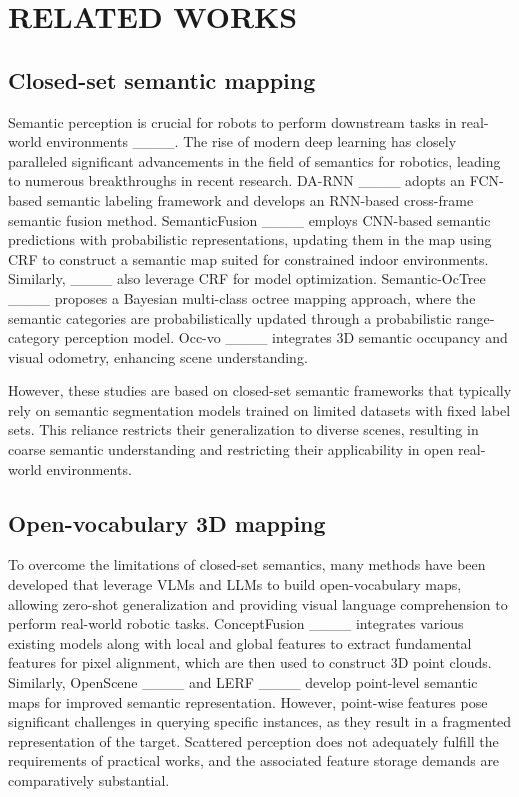 \section{RELATED WORKS}
\label{RW}

\subsection{Closed-set semantic mapping}
Semantic perception is crucial for robots to perform downstream tasks in real-world environments ____. The rise of modern deep learning has closely paralleled significant advancements in the field of semantics for robotics, leading to numerous breakthroughs in recent research. 
DA-RNN ____ adopts an FCN-based semantic labeling framework and develops an RNN-based cross-frame semantic fusion method. 
SemanticFusion ____ employs CNN-based semantic predictions with probabilistic representations, updating them in the map using CRF to construct a semantic map suited for constrained indoor environments. Similarly, ____ also leverage CRF for model optimization.
Semantic-OcTree ____ proposes a Bayesian multi-class octree mapping approach, where the semantic categories are probabilistically updated through a probabilistic range-category perception model. Occ-vo ____ integrates 3D semantic occupancy and visual odometry, enhancing scene understanding.

However, these studies are based on closed-set semantic frameworks that typically rely on semantic segmentation models trained on limited datasets with fixed label sets. This reliance restricts their generalization to diverse scenes, resulting in coarse semantic understanding and restricting their applicability in open real-world environments.


\subsection{Open-vocabulary 3D mapping}

To overcome the limitations of closed-set semantics, many methods have been developed that leverage VLMs and LLMs to build open-vocabulary maps, allowing zero-shot generalization and providing visual language comprehension to perform real-world robotic tasks.
ConceptFusion ____ integrates various existing models along with local and global features to extract fundamental features for pixel alignment, which are then used to construct 3D point clouds.
Similarly, OpenScene ____ and LERF ____ develop point-level semantic maps for improved semantic representation. 
However, point-wise features pose significant challenges in querying specific instances, as they result in a fragmented representation of the target. Scattered perception does not adequately fulfill the requirements of practical works, and the associated feature storage demands are comparatively substantial.


